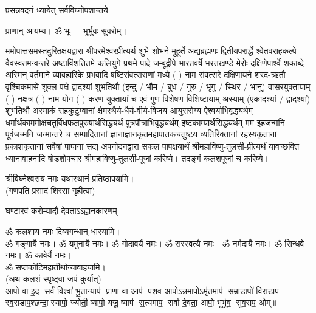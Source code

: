 
\setlength{\parindent}{0pt}




{प्रसन्नवदनं ध्यायेत् सर्वविघ्नोपशान्तये}
 
प्राणान्  आयम्य।  ॐ भूः + भूर्भुवः॒ सुव॒रोम्।


ममोपात्तसमस्तदुरितक्षयद्वारा श्रीपरमेश्वरप्रीत्यर्थं शुभे शोभने मुहूर्ते अद्यब्रह्मणः
द्वितीयपरार्द्धे श्वेतवराहकल्पे वैवस्वतमन्वन्तरे अष्टाविंशतितमे कलियुगे प्रथमे पादे
जम्बूद्वीपे भारतवर्षे भरतखण्डे मेरोः दक्षिणेपार्श्वे शकाब्दे अस्मिन् वर्तमाने व्यावहारिके
 प्रभवादि षष्टिसंवत्सराणां मध्ये (  ) नाम संवत्सरे दक्षिणायने
शरद-ऋतौ  वृश्चिकमासे शुक्ल पक्षे द्वादश्यां शुभतिथौ
(इन्दु / भौम / बुध / गुरु / भृगु / स्थिर / भानु) वासरयुक्तायाम्
(  ) नक्षत्र (  ) नाम  योग  (  ) करण युक्तायां च एवं गुण विशेषण विशिष्टायाम्
अस्याम् (एकादश्यां / द्वादश्यां) शुभतिथौ
अस्माकं सहकुटुम्बानां क्षेमस्थैर्य-धैर्य-वीर्य-विजय आयुरारोग्य ऐश्वर्याभिवृद्ध्यर्थम्
 धर्मार्थकाममोक्ष\-चतुर्विधफलपुरुषार्थसिद्ध्यर्थं पुत्रपौत्राभि\-वृद्ध्यर्थम् इष्टकाम्यार्थसिद्ध्यर्थम्
मम इहजन्मनि पूर्वजन्मनि जन्मान्तरे च सम्पादितानां ज्ञानाज्ञानकृतमहा\-पातकचतुष्टय
व्यतिरिक्तानां रहस्यकृतानां प्रकाशकृतानां सर्वेषां पापानां सद्य अपनोदनद्वारा सकल
पापक्षयार्थं श्रीमहाविष्णु-तुलसी-प्रीत्यर्थं यावच्छक्ति ध्यानावाहनादि
षोडशोपचार श्रीमहाविष्णु-तुलसी-पूजां करिष्ये। तदङ्गं कलशपूजां च करिष्ये।


श्रीविघ्नेश्वराय नमः यथास्थानं प्रतिष्ठापयामि।\\
(गणपति प्रसादं शिरसा गृहीत्वा)



{घण्टारवं करोम्यादौ देवताऽऽह्वानकारणम्}

ॐ कलशाय नमः दिव्यगन्धान् धारयामि।\\
ॐ गङ्गायै नमः। ॐ यमुनायै नमः। ॐ गोदावर्यै नमः।  ॐ सरस्वत्यै नमः। ॐ नर्मदायै नमः। ॐ सिन्धवे नमः। ॐ कावेर्यै नमः।\\
 ॐ सप्तकोटिमहातीर्थान्यावाहयामि। \\

(अथ कलशं स्पृष्ट्वा जपं कुर्यात्) \\
आपो॒ वा इ॒द सर्वं॒ विश्वा॑ भू॒तान्याप॑ प्रा॒णा वा आप॑ प॒शव॒ आपो\-ऽन्न॒मापोऽमृ॑त॒माप॑ स॒म्राडापो॑ वि॒राडाप॑ स्व॒राडाप॒श्\-छन्दा॒स्यापो॒ ज्योती॒ष्यापो॒ यजू॒ष्याप॑ स॒त्यमाप॒ सर्वा॑ दे॒वता॒ आपो॒ भूर्भुव॒ सुव॒राप॒ ओम्॥\\

